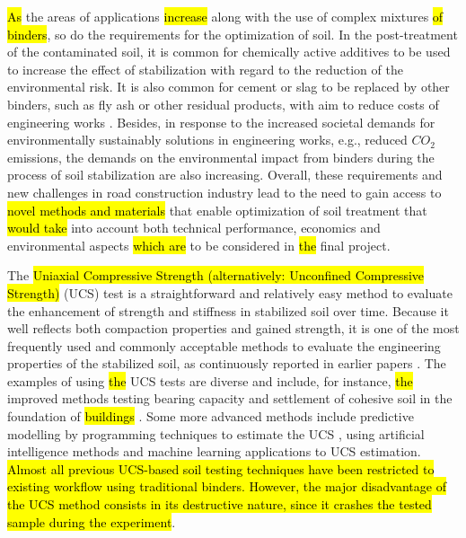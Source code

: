 \documentclass[materials,article,submit,pdftex,moreauthors]{Definitions/mdpi}
\begin{document}
\hl{As }the areas of applications \hl{increase} along with the use of complex mixtures \hl{of binders}, so do the requirements for the optimization of soil. In the post-treatment of the contaminated soil, it is common for chemically active additives to be used to increase the effect of stabilization with regard to the reduction of the environmental risk. It is also common for cement or slag to be replaced by other binders, such as fly ash or other residual products, with aim to reduce costs of engineering works \citep{Arulrajah,LindhLemenkova2022a,Jaferetal2018}. Besides, in response to the increased societal demands for environmentally sustainably solutions in engineering works, e.g., reduced $CO_2$ emissions, the demands on the environmental impact from binders during the process of soil stabilization are also increasing. Overall, these requirements and new challenges in road construction industry lead to the need to gain access to \hl{novel methods and materials} that enable optimization of soil treatment that \hl{would take} into account both technical performance, economics and environmental aspects \hl{which are} to be considered in \hl{the }final project.

The \hl{Uniaxial Compressive Strength (alternatively: Unconfined Compressive Strength)} (UCS) test is a straightforward and relatively easy method to evaluate the enhancement of strength and stiffness in stabilized soil over time. Because it well reflects both compaction properties and gained strength, it is one of the most frequently used and commonly acceptable methods to evaluate the engineering properties of the stabilized soil, as continuously reported in earlier papers \cite{Eskisar,Feng,Rodriguez,Christensen}. The examples of using \hl{the} UCS tests are diverse and include, for instance, \hl{the} improved methods testing bearing capacity and settlement of cohesive soil in the foundation of \hl{buildings} \cite{Alshkane}. Some more advanced methods include predictive modelling by programming techniques to estimate the UCS \cite{Onyelowe}, using artificial intelligence methods \citep{Tabarsa,Sihag,Liuetal2015} and machine learning applications\hl{ }\citep{Furtney,Sihag} to UCS estimation. \hl{Almost all previous UCS-based soil testing techniques have been restricted to existing workflow using traditional binders. However, the major disadvantage of the UCS method consists in its destructive nature, since it crashes the tested sample during the experiment}.
\end{document}
